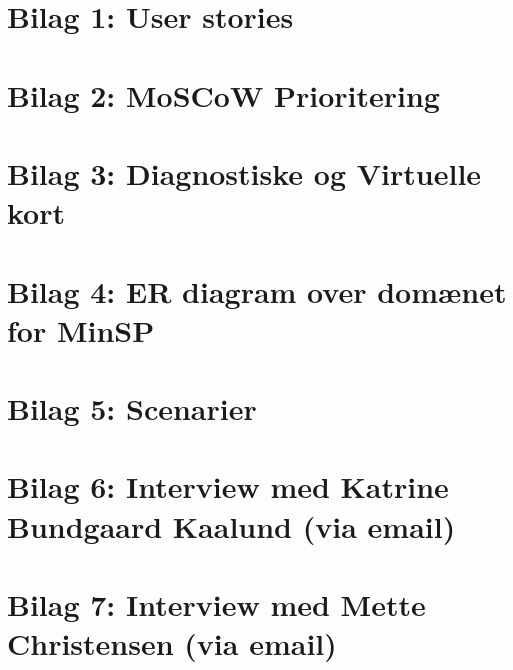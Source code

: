 \section{Bilag 1: \hspace*{0.5mm} User stories}

\newpage
\section{Bilag 2: \hspace*{0.5mm} MoSCoW Prioritering}

\section{Bilag 3: \hspace*{0.5mm} Diagnostiske og Virtuelle kort}

\section{Bilag 4: \hspace*{0.5mm} ER diagram over domænet for MinSP}

\section{Bilag 5: \hspace*{0.5mm} Scenarier}

\newpage
\section{Bilag 6: \hspace*{0.5mm} Interview med Katrine Bundgaard Kaalund (via email)}

\newpage
\section{Bilag 7: \hspace*{0.5mm} Interview med Mette Christensen (via email)}

